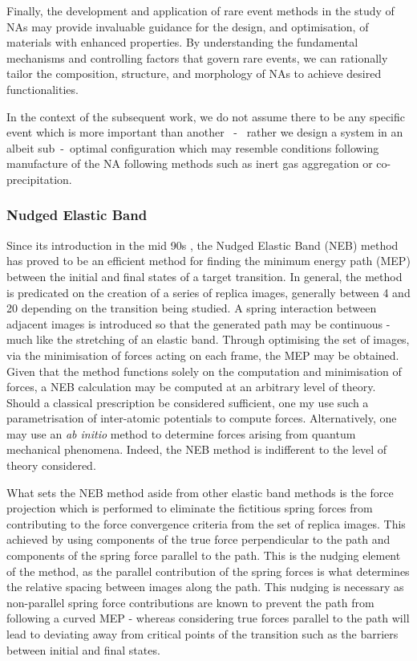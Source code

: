 Finally, the development and application of rare event methods in the study of NAs may provide invaluable guidance for the design, and optimisation, of materials with enhanced properties. By understanding the fundamental mechanisms and controlling factors that govern rare events, we can rationally tailor the composition, structure, and morphology of NAs to achieve desired functionalities. 

In the context of the subsequent work, we do not assume there to be any specific event which is more important than another ~-~ rather we design a system in an albeit sub~-~optimal configuration which may resemble conditions following manufacture of the NA following methods such as inert gas aggregation or co-precipitation. 

\subsubsection{Nudged Elastic Band}
\label{sec:NEB}
Since its introduction in the mid 90s \cite{NEB_Book,NEB_Paper}, the Nudged Elastic Band (NEB) method has proved to be an efficient method for finding the minimum energy path (MEP) between the initial and final states of a target transition. In general, the method is predicated on the creation of a series of replica images, generally between 4 and 20 depending on the transition being studied. A spring interaction between adjacent images is introduced so that the generated path may be continuous - much like the stretching of an elastic band. Through optimising the set of images, via the minimisation of forces acting on each frame, the MEP may be obtained. Given that the method functions solely on the computation and minimisation of forces, a NEB calculation may be computed at an arbitrary level of theory. Should a classical prescription be considered sufficient, one my use such a parametrisation of inter-atomic potentials to compute forces. Alternatively, one may use an \textit{ab initio} method to determine forces arising from quantum mechanical phenomena. Indeed, the NEB method is indifferent to the level of theory considered.

What sets the NEB method aside from other elastic band methods is the force projection which is performed to eliminate the fictitious spring forces from contributing to the force convergence criteria from the set of replica images. This achieved by using components of the true force perpendicular to the path and components of the spring force parallel to the path. This is the nudging element of the method, as the parallel contribution of the spring forces is what determines the relative spacing between images along the path. This nudging is necessary as non-parallel spring force contributions are known to prevent the path from following a curved MEP - whereas considering true forces parallel to the path will lead to deviating away from critical points of the transition such as the barriers between initial and final states.

